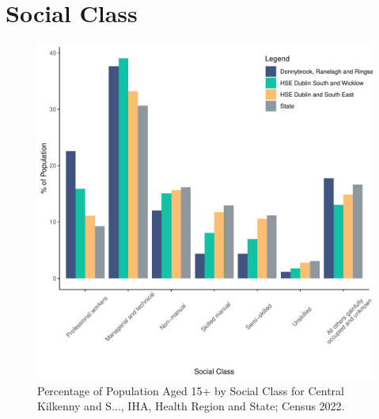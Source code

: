 \documentclass{article}
\begin{document}
\section{Social Class}\label{sect:SC}
\begin{figure}[H]
	\centering
	\includegraphics[width = 140mm]{../figures/SocialClassED.pdf}
	\caption{Percentage of Population Aged 15+ by Social Class for Central Kilkenny and S..., IHA, Health Region and State; Census 2022.}
	\label{fig:vbnv}
	\end{figure}
\end{document}
